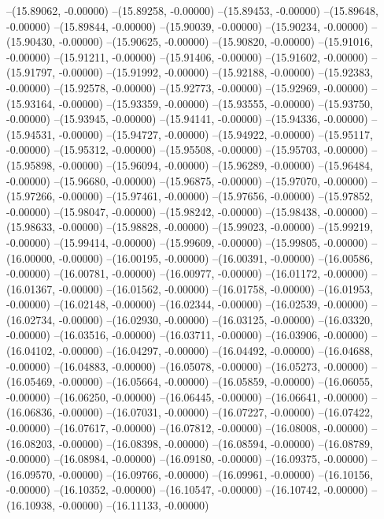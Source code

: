 --(15.89062, -0.00000)
--(15.89258, -0.00000)
--(15.89453, -0.00000)
--(15.89648, -0.00000)
--(15.89844, -0.00000)
--(15.90039, -0.00000)
--(15.90234, -0.00000)
--(15.90430, -0.00000)
--(15.90625, -0.00000)
--(15.90820, -0.00000)
--(15.91016, -0.00000)
--(15.91211, -0.00000)
--(15.91406, -0.00000)
--(15.91602, -0.00000)
--(15.91797, -0.00000)
--(15.91992, -0.00000)
--(15.92188, -0.00000)
--(15.92383, -0.00000)
--(15.92578, -0.00000)
--(15.92773, -0.00000)
--(15.92969, -0.00000)
--(15.93164, -0.00000)
--(15.93359, -0.00000)
--(15.93555, -0.00000)
--(15.93750, -0.00000)
--(15.93945, -0.00000)
--(15.94141, -0.00000)
--(15.94336, -0.00000)
--(15.94531, -0.00000)
--(15.94727, -0.00000)
--(15.94922, -0.00000)
--(15.95117, -0.00000)
--(15.95312, -0.00000)
--(15.95508, -0.00000)
--(15.95703, -0.00000)
--(15.95898, -0.00000)
--(15.96094, -0.00000)
--(15.96289, -0.00000)
--(15.96484, -0.00000)
--(15.96680, -0.00000)
--(15.96875, -0.00000)
--(15.97070, -0.00000)
--(15.97266, -0.00000)
--(15.97461, -0.00000)
--(15.97656, -0.00000)
--(15.97852, -0.00000)
--(15.98047, -0.00000)
--(15.98242, -0.00000)
--(15.98438, -0.00000)
--(15.98633, -0.00000)
--(15.98828, -0.00000)
--(15.99023, -0.00000)
--(15.99219, -0.00000)
--(15.99414, -0.00000)
--(15.99609, -0.00000)
--(15.99805, -0.00000)
--(16.00000, -0.00000)
--(16.00195, -0.00000)
--(16.00391, -0.00000)
--(16.00586, -0.00000)
--(16.00781, -0.00000)
--(16.00977, -0.00000)
--(16.01172, -0.00000)
--(16.01367, -0.00000)
--(16.01562, -0.00000)
--(16.01758, -0.00000)
--(16.01953, -0.00000)
--(16.02148, -0.00000)
--(16.02344, -0.00000)
--(16.02539, -0.00000)
--(16.02734, -0.00000)
--(16.02930, -0.00000)
--(16.03125, -0.00000)
--(16.03320, -0.00000)
--(16.03516, -0.00000)
--(16.03711, -0.00000)
--(16.03906, -0.00000)
--(16.04102, -0.00000)
--(16.04297, -0.00000)
--(16.04492, -0.00000)
--(16.04688, -0.00000)
--(16.04883, -0.00000)
--(16.05078, -0.00000)
--(16.05273, -0.00000)
--(16.05469, -0.00000)
--(16.05664, -0.00000)
--(16.05859, -0.00000)
--(16.06055, -0.00000)
--(16.06250, -0.00000)
--(16.06445, -0.00000)
--(16.06641, -0.00000)
--(16.06836, -0.00000)
--(16.07031, -0.00000)
--(16.07227, -0.00000)
--(16.07422, -0.00000)
--(16.07617, -0.00000)
--(16.07812, -0.00000)
--(16.08008, -0.00000)
--(16.08203, -0.00000)
--(16.08398, -0.00000)
--(16.08594, -0.00000)
--(16.08789, -0.00000)
--(16.08984, -0.00000)
--(16.09180, -0.00000)
--(16.09375, -0.00000)
--(16.09570, -0.00000)
--(16.09766, -0.00000)
--(16.09961, -0.00000)
--(16.10156, -0.00000)
--(16.10352, -0.00000)
--(16.10547, -0.00000)
--(16.10742, -0.00000)
--(16.10938, -0.00000)
--(16.11133, -0.00000)
